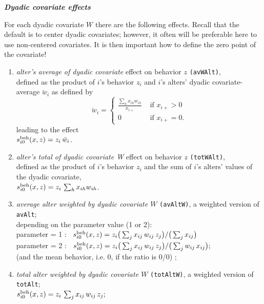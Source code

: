 \documentclass[a4paper,fleqn,11pt]{article}
\newcommand{\+}{\, + \,}
\newcommand{\vit}{\theenumi}
\newcounter{savenumi}
\begin{document}
\noindent
\textbf{\emph{Dyadic covariate effects}}
\medskip

For each dyadic covariate $W$ there are the following effects.
Recall that the default is to center dyadic covariates; however, it often
will be preferable here to use non-centered covariates.
It is then important how to define the zero point of the covariate!

\begin{enumerate}
\setcounter{enumi}{\value{savenumi}}


\item \emph{alter's  average of dyadic covariate } effect on behavior $z$
 \texttt{(avWAlt)},\\
      defined as the product of $i$'s behavior $z_i$ and
      $i$'s alters' dyadic covariate-average $\breve w_i$ as defined by
\begin{equation}
  \breve w_i = \left\{\begin{array}{ll} \displaystyle
         \frac{\sum_h x_{ih}w_{ih}}{x_{i+}}  &  \text{ if } x_{i+} > 0     \\
         0                                &  \text{ if } x_{i+} = 0  .
  \end{array}   \right.            \label{alt_avwa}
\end{equation}
      leading to the effect \\
       $s^{\rm beh}_{i\vit}(x, z) = z_i \, \breve w_i $.\\

\item \emph{alter's  total of dyadic covariate W } effect on behavior $z$
 \texttt{(totWAlt)},\\
      defined as the product of $i$'s behavior $z_i$ and
      the sum of $i$'s alters' values of the dyadic covariate, \\
       $s^{\rm beh}_{i\vit}(x, z) = z_i \, \sum_h x_{ih}w_{ih}  $.\\

 \item {\em average alter weighted by dyadic covariate $W$}
                       \texttt{(avAltW)},
                       a weighted version of  \texttt{avAlt};\\
                       depending on the parameter value (1 or 2):\\
  parameter = 1 : \ $s^{\rm beh}_{i\vit}(x, z) =
                     z_i \big( \sum_j x_{ij} \, w_{ij} \, z_j \big)  /
                                        \big (\sum_j x_{ij}\big)$\\
   parameter = 2 : \  $s^{\rm beh}_{i\vit}(x, z) =
                    z_i \big( \sum_j x_{ij} \, w_{ij} \, z_j \big)  /
                                \big (\sum_j w_{ij} \,x_{ij}\big) ;$\\
 (and the mean behavior, i.e. $0$, if the ratio is 0/0) ;
 \item {\em total alter weighted by dyadic covariate $W$}
                       \texttt{(totAltW)},
                       a weighted version of  \texttt{totAlt};\\
   $s^{\rm beh}_{i\vit}(x, z) =  z_i \, \sum_j x_{ij} \, w_{ij} \, z_j  ;$


\end{enumerate}
\end{document}

